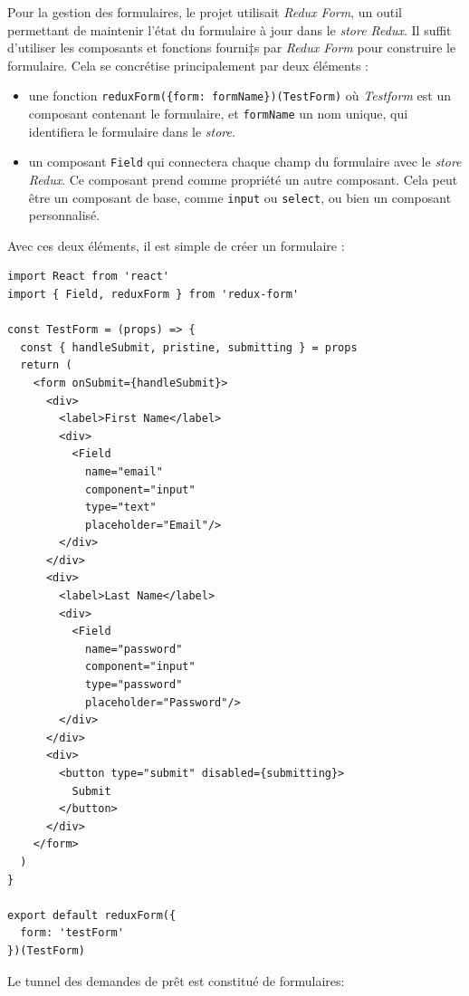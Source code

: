 \bigskip

Pour la gestion des formulaires, le projet utilisait \emph{Redux Form},
un outil permettant de maintenir l'état du formulaire à jour dans le
\emph{store Redux}. Il suffit d'utiliser les composants et fonctions
fourni‡s par \emph{Redux Form} pour construire le formulaire. Cela se
concrétise principalement par deux éléments :

\begin{itemize}
\tightlist
\item
  une fonction
  \texttt{reduxForm(\{form:\ \textquotesingle{}formName\textquotesingle{}\})(TestForm)}
  où \emph{Testform} est un composant contenant le formulaire, et
  \texttt{formName} un nom unique, qui identifiera le formulaire dans le
  \emph{store}.
\item
  un composant \texttt{Field} qui connectera chaque champ du formulaire
  avec le \emph{store Redux}. Ce composant prend comme propriété un
  autre composant. Cela peut être un composant de base, comme
  \texttt{input} ou \texttt{select}, ou bien un composant personnalisé.
\end{itemize}

Avec ces deux éléments, il est simple de créer un formulaire :

\begin{verbatim}
import React from 'react'
import { Field, reduxForm } from 'redux-form'

const TestForm = (props) => {
  const { handleSubmit, pristine, submitting } = props
  return (
    <form onSubmit={handleSubmit}>
      <div>
        <label>First Name</label>
        <div>
          <Field
            name="email"
            component="input"
            type="text"
            placeholder="Email"/>
        </div>
      </div>
      <div>
        <label>Last Name</label>
        <div>
          <Field
            name="password"
            component="input"
            type="password"
            placeholder="Password"/>
        </div>
      </div>
      <div>
        <button type="submit" disabled={submitting}>
          Submit
        </button>
      </div>
    </form>
  )
}

export default reduxForm({
  form: 'testForm'
})(TestForm)
\end{verbatim}

\bigskip

Le tunnel des demandes de prêt est constitué de formulaires:

